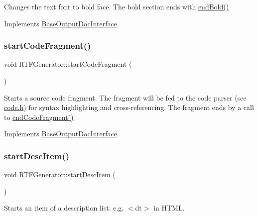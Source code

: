 Changes the text font to bold face. The bold section ends with \mbox{\hyperlink{class_r_t_f_generator_a430a7df863505527d0b1da4c70116a05}{end\+Bold()}} 

Implements \mbox{\hyperlink{class_base_output_doc_interface_aa0bfe5ef08077a7191ba4666f47c441b}{Base\+Output\+Doc\+Interface}}.

\mbox{\label{class_r_t_f_generator_ac7783a014fb21a8688b4f334aea2cc30}} 
\subsubsection{\texorpdfstring{startCodeFragment()}{startCodeFragment()}}
{\footnotesize\ttfamily void R\+T\+F\+Generator\+::start\+Code\+Fragment (\begin{DoxyParamCaption}{ }\end{DoxyParamCaption})\hspace{0.3cm}{\ttfamily [virtual]}}

Starts a source code fragment. The fragment will be fed to the code parser (see \mbox{\hyperlink{code_8h_source}{code.\+h}}) for syntax highlighting and cross-\/referencing. The fragment ends by a call to \mbox{\hyperlink{class_r_t_f_generator_ae75111adf81a1179b924ab7656d8c74c}{end\+Code\+Fragment()}} 

Implements \mbox{\hyperlink{class_base_output_doc_interface_ab19fc767b08c25b0ca7c976d24799bda}{Base\+Output\+Doc\+Interface}}.

\mbox{\label{class_r_t_f_generator_a39ef721382a2a25ef0a41463a34f1b02}} 
\subsubsection{\texorpdfstring{startDescItem()}{startDescItem()}}
{\footnotesize\ttfamily void R\+T\+F\+Generator\+::start\+Desc\+Item (\begin{DoxyParamCaption}{ }\end{DoxyParamCaption})\hspace{0.3cm}{\ttfamily [virtual]}}

Starts an item of a description list\+: e.\+g. {\ttfamily $<$dt$>$} in H\+T\+ML. 

